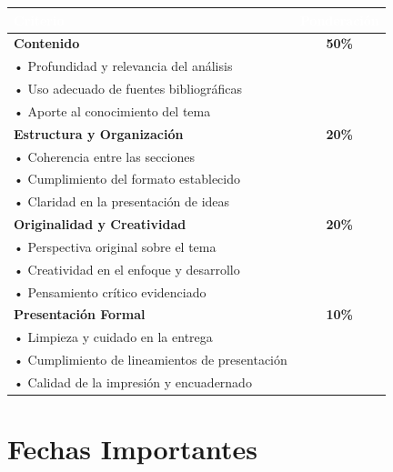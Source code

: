 \documentclass[12pt,a4paper]{article}
\begin{document}
\begin{table}[h]
\centering
\begin{tabular}{|p{7cm}|c|}
\hline
\rowcolor{primaryblue}
\textcolor{white}{\textbf{Criterio}} & \textcolor{white}{\textbf{Ponderación}} \\
\hline
\textbf{Contenido} & \textbf{50\%} \\
\hline
\quad • Profundidad y relevancia del análisis & \\
\quad • Uso adecuado de fuentes bibliográficas & \\
\quad • Aporte al conocimiento del tema & \\
\hline
\textbf{Estructura y Organización} & \textbf{20\%} \\
\hline
\quad • Coherencia entre las secciones & \\
\quad • Cumplimiento del formato establecido & \\
\quad • Claridad en la presentación de ideas & \\
\hline
\textbf{Originalidad y Creatividad} & \textbf{20\%} \\
\hline
\quad • Perspectiva original sobre el tema & \\
\quad • Creatividad en el enfoque y desarrollo & \\
\quad • Pensamiento crítico evidenciado & \\
\hline
\textbf{Presentación Formal} & \textbf{10\%} \\
\hline
\quad • Limpieza y cuidado en la entrega & \\
\quad • Cumplimiento de lineamientos de presentación & \\
\quad • Calidad de la impresión y encuadernado & \\
\hline
\end{tabular}
\end{table}

\section{Fechas Importantes}
\end{document}
